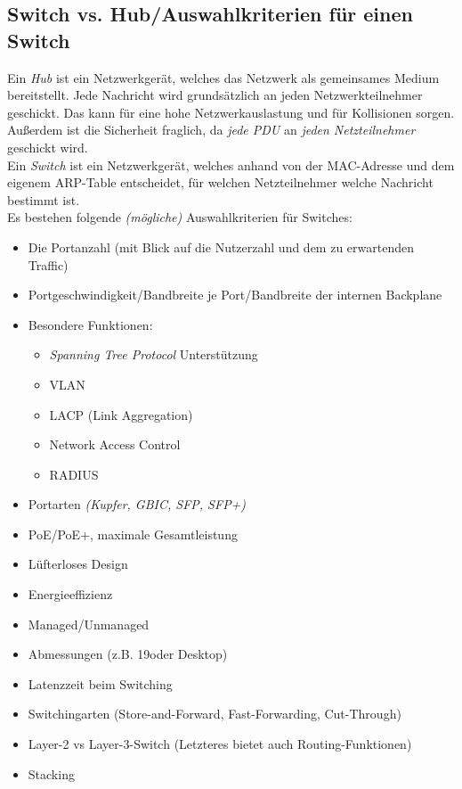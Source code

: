 \documentclass[a4paper, 12pt]{report}
\begin{document}
\subsection{Switch vs. Hub/Auswahlkriterien für einen Switch}

Ein \emph{Hub} ist ein Netzwerkgerät, welches das Netzwerk als gemeinsames
Medium bereitstellt. Jede Nachricht wird grundsätzlich an jeden
Netzwerkteilnehmer geschickt. Das kann für eine hohe Netzwerkauslastung und für
Kollisionen sorgen. Außerdem ist die Sicherheit fraglich, da \emph{jede PDU} an
\emph{jeden Netzteilnehmer} geschickt wird. \\

Ein \emph{Switch} ist ein Netzwerkgerät, welches anhand von der MAC-Adresse und
dem eigenem ARP-Table entscheidet, für welchen Netzteilnehmer welche Nachricht
bestimmt ist. \\

Es bestehen folgende \emph{(mögliche)} Auswahlkriterien für Switches:

\begin{itemize}
    \item Die Portanzahl (mit Blick auf die Nutzerzahl und dem zu erwartenden
	Traffic)
    \item Portgeschwindigkeit/Bandbreite je Port/Bandbreite der internen
	Backplane
    \item Besondere Funktionen:
	\begin{itemize}
	    \item \emph{Spanning Tree Protocol} Unterstützung
	    \item VLAN
	    \item LACP (Link Aggregation)
	    \item Network Access Control
	    \item RADIUS
	\end{itemize}
    \item Portarten \emph{(Kupfer, GBIC, SFP, SFP+)}
    \item PoE/PoE+, maximale Gesamtleistung
    \item Lüfterloses Design
    \item Energieeffizienz
    \item Managed/Unmanaged
    \item Abmessungen (z.B. 19\dq oder Desktop)
    \item Latenzzeit beim Switching
    \item Switchingarten (Store-and-Forward, Fast-Forwarding, Cut-Through)
    \item Layer-2 vs Layer-3-Switch (Letzteres bietet auch Routing-Funktionen)
    \item Stacking
\end{itemize}
\end{document}
